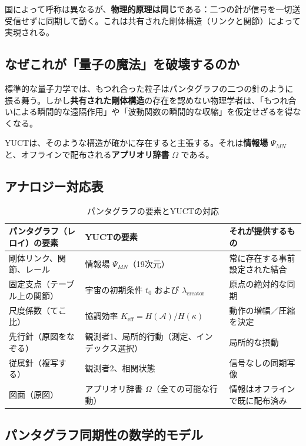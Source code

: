 \documentclass[12pt,a4paper]{article}
\begin{document}
	国によって呼称は異なるが、\textbf{物理的原理は同じ}である：二つの針が信号を一切送受信せずに同期して動く。これは共有された剛体構造（リンクと関節）によって実現される。
	
	\subsection{なぜこれが「量子の魔法」を破壊するのか}
	
	標準的な量子力学では、もつれ合った粒子はパンタグラフの二つの針のように振る舞う。しかし\textbf{共有された剛体構造}の存在を認めない物理学者は、「もつれ合いによる瞬間的な遠隔作用」や「波動関数の瞬間的な収縮」を仮定せざるを得なくなる。
	
	YUCTは、そのような構造が確かに存在すると主張する。それは\textbf{情報場} \(\Psi_{MN}\) と、オフラインで配布される\textbf{アプリオリ辞書} \(\Omega\) である。
	
	\subsection{アナロジー対応表}
	
	\begin{table}[htbp]
		\centering
		\caption{パンタグラフの要素とYUCTの対応}
		\label{tab:pantograf}
		\begin{tabular}{|p{3.5cm}|p{3.5cm}|p{5.5cm}|}
			\hline
			\textbf{パンタグラフ（レロイ）の要素} & \textbf{YUCTの要素} & \textbf{それが提供するもの} \\
			\hline
			剛体リンク、関節、レール & 情報場 \(\Psi_{MN}\)（19次元） & 常に存在する事前設定された結合 \\
			\hline
			固定支点（テーブル上の関節） & 宇宙の初期条件 \(t_0\) および \(\lambda_{\mathrm{creator}}\) & 原点の絶対的な同期 \\
			\hline
			尺度係数（てこ比） & 協調効率 \(K_{\mathrm{eff}} = H(\mathcal{A})/H(\kappa)\) & 動作の増幅／圧縮を決定 \\
			\hline
			先行針（原図をなぞる） & 観測者1、局所的行動（測定、インデックス選択） & 局所的な摂動 \\
			\hline
			従属針（複写する） & 観測者2、相関状態 & 信号なしの同期写像 \\
			\hline
			図面（原図） & アプリオリ辞書 \(\Omega\)（全ての可能な行動） & 情報はオフラインで既に配布済み \\
			\hline
		\end{tabular}
	\end{table}
	
	\subsection{パンタグラフ同期性の数学的モデル}
	
\end{document}
